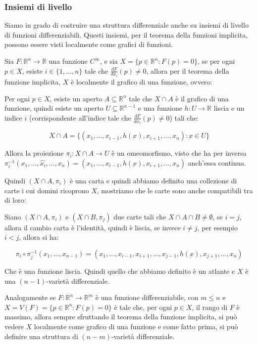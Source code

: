 \documentclass[12pt, a4paper]{article}
\theoremstyle{definition}
\begin{document}
\subsubsection{Insiemi di livello}
Siamo in grado di costruire una struttura differenziale anche su insiemi di livello di funzioni differenziabili. Questi insiemi, per il teorema della funzioni implicita, possono essere visti
localmente come grafici di funzioni.

Sia $F : \mathbb{R}^n \to \mathbb{R}$ una funzione $C^{\infty}$, e sia $X = \{ p \in \mathbb{R}^n : F(p) = 0 \}$, se per ogni $p \in X$, esiste $i \in \{1,\ldots,n\}$ tale che $\frac{dF}{dx_i}(p) \neq 0$,
allora per il teorema della funzione implicita, $X$ è localmente il grafico di una funzione, ovvero:

Per ogni $p \in X$, esiste un aperto $A \subseteq \mathbb{R}^n$ tale che $X \cap A$ è il grafico di una funzione,  quindi esiste un aperto $U \subseteq \mathbb{R}^{n-1}$ e una funzione
$h : U \to \mathbb{R}$ liscia e un indice $i$ (corrispondente all'indice tale che $\frac{dF}{dx_i}(p) \neq 0$) tali che:

$$X \cap A = \{ (x_1, \ldots, x_{i-1}, h(\underbar{x}), x_{i+1}, \ldots, x_n) : \underbar{x} \in U \}$$

Allora la proiezione $\pi_i : X \cap A \to U$ è un omeomorfismo, visto che ha per inversa $\pi_i^{-1}(x_1, \ldots, \hat{x_i}, \ldots, x_n) = (x_1, \ldots, x_{i-1}, h(\underbar{x}), x_{i+1}, \ldots, x_n)$ anch'essa continua.

Quindi $(X \cap A, \pi_i)$ è una carta e quindi abbiamo definito una collezione di carte i cui domini ricoprono $X$, mostriamo che le carte sono anche compatibili tra di loro:

Siano $(X \cap A, \pi_i)$ e $(X \cap B, \pi_j)$ due carte tali che $X \cap A \cap B \neq \emptyset$, se $i = j$, allora il cambio carta è l'identità, quindi è liscia,
se invece $i \neq j$, per esempio $i < j$, allora si ha:

$$\pi_i \circ \pi_j^{-1} (x_1, \ldots, x_{n-1}) = (x_1, \ldots, x_{i-1}, x_{i+1}, \ldots, x_{j-1}, h(\underbar{x}), x_{j+1}, \ldots, x_n)$$

Che è una funzione liscia. Quindi quello che abbiamo definito è un atlante e $X$ è una $(n-1)$-varietà differenziale.

Analogamente se $F : \mathbb{R}^n \to \mathbb{R}^m$ è una funzione differenziabile, con $m \le n$ e $X = V(F) = \{ p \in \mathbb{R}^n : F(p) = 0 \}$ è tale che, per ogni $p \in X$,
il rango di $F$ è massimo, allora sempre sfruttando il teorema della funzione implicita, si può vedere $X$ localmente come grafico di una funzione e come fatto prima, si può definire
una struttura di $(n-m)$-varietà differenziale.
\end{document}
